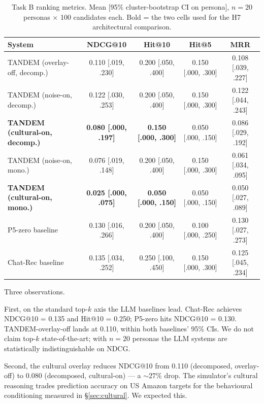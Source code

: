 \documentclass[8pt,twocolumn,a4paper]{extarticle}
\begin{document}
\begin{table}[t]
\centering
\footnotesize
\setlength{\tabcolsep}{4pt}
\renewcommand{\arraystretch}{1.05}
\caption{Task B ranking metrics. Mean [95\% cluster-bootstrap CI on persona], $n=20$ personas $\times$ 100 candidates each. Bold = the two cells used for the H7 architectural comparison.}
\label{tab:taskb}
\begin{tabular}{lcccc}
\toprule
System                                 & NDCG@10               & Hit@10               & Hit@5                & MRR                  \\
\midrule
TANDEM (overlay-off, decomp.)          & 0.110 [.019, .230]    & 0.200 [.050, .400]   & 0.150 [.000, .300]   & 0.108 [.039, .227]   \\
TANDEM (noise-on, decomp.)             & 0.122 [.030, .253]    & 0.200 [.050, .400]   & 0.150 [.000, .300]   & 0.122 [.044, .243]   \\
\textbf{TANDEM (cultural-on, decomp.)} & \textbf{0.080 [.000, .197]} & \textbf{0.150 [.000, .300]} & 0.050 [.000, .150] & 0.086 [.029, .192] \\
TANDEM (noise-on, mono.)               & 0.076 [.019, .148]    & 0.200 [.050, .400]   & 0.150 [.000, .300]   & 0.061 [.034, .095]   \\
\textbf{TANDEM (cultural-on, mono.)}   & \textbf{0.025 [.000, .075]} & \textbf{0.050 [.000, .150]} & 0.050 [.000, .150] & 0.050 [.027, .089] \\
\midrule
P5-zero baseline                       & 0.130 [.016, .266]    & 0.200 [.050, .400]   & 0.100 [.000, .250]   & 0.130 [.027, .273]   \\
Chat-Rec baseline                      & 0.135 [.034, .252]    & 0.250 [.100, .450]   & 0.150 [.000, .300]   & 0.125 [.045, .234]   \\
\bottomrule
\end{tabular}
\end{table}

Three observations.

First, on the standard top-$k$ axis the LLM baselines lead. Chat-Rec achieves NDCG@10 = 0.135 and Hit@10 = 0.250; P5-zero hits NDCG@10 = 0.130. TANDEM-overlay-off lands at 0.110, within both baselines' 95\% CIs. We do not claim top-$k$ state-of-the-art; with $n=20$ personas the LLM systems are statistically indistinguishable on NDCG.

Second, the cultural overlay reduces NDCG@10 from 0.110 (decomposed, overlay-off) to 0.080 (decomposed, cultural-on) --- a ${\sim}27\%$ drop. The simulator's cultural reasoning trades prediction accuracy on US Amazon targets for the behavioural conditioning measured in \S\ref{sec:cultural}. We expected this.
\end{document}
